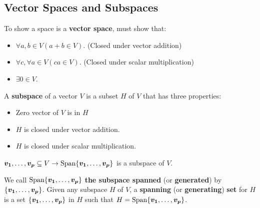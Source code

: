 \documentclass[11pt]{scrartcl}
\theoremstyle{dotlessP}
\theoremstyle{dotlessN}
\DeclarePairedDelimiter\set{\{}{\}}
\newcommand{\spa}[1]{\text{Span}\set*{#1}}
\begin{document}
\subsection{Vector Spaces and Subspaces}
\begin{definition}
	To show a space is a \textbf{vector space}, must show that:
	\begin{itemize}
		\item $\forall a,b \in V (a + b \in V)$. (Closed under vector addition)
		\item $\forall c, \forall a \in V (ca \in V)$. (Closed under scalar multiplication)
		\item $\exists 0 \in V$.
	\end{itemize}
\end{definition}
\begin{definition}
	A \textbf{subspace} of a vector $V$ is a subset $H$ of $V$ that has three properties:
	\begin{itemize}
		\item Zero vector of $V$ is in $H$
		\item $H$ is closed under vector addition.
		\item  $H$ is closed under scalar multiplication.
	\end{itemize}
\end{definition}
\begin{theorem}
	$\bm{v_1},\dots,\bm{v_p} \subseteq V \to \spa{\bm{v_1}, \dots, \bm{v_p}}$ is a subspace of $V$.
\end{theorem}
\begin{remark}
	We call $\spa{\bm{v_1},\dots,\bm{v_p}}$ \textbf{the subspace spanned} (or \textbf{generated}) by $\set*{\bm{v_1},\dots,\bm{v_p}}$. Given any subspace $H$ of $V$, a \textbf{spanning} (or \textbf{generating}) \textbf{set} for $H$ is a set $\set*{\bm{v_1},\dots, \bm{v_p}}$ in $H$ such that $H = \spa{\bm{v_1},\dots,\bm{v_p}}$.
\end{remark}
\end{document}
